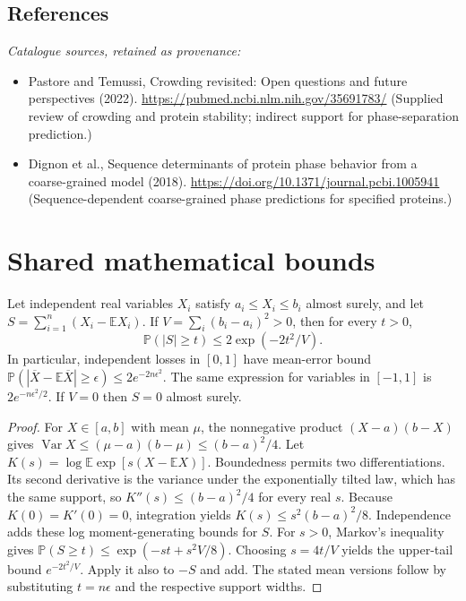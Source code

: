 \documentclass[11pt]{article}
\begin{document}
\subsection{References}
\noindent\emph{Catalogue sources, retained as provenance:}
\begin{itemize}
\item Pastore and Temussi, Crowding revisited: Open questions and future perspectives (2022). \url{https://pubmed.ncbi.nlm.nih.gov/35691783/} (Supplied review of crowding and protein stability; indirect support for phase-separation prediction.)
\item Dignon et al., Sequence determinants of protein phase behavior from a coarse-grained model (2018). \url{https://doi.org/10.1371/journal.pcbi.1005941} (Sequence-dependent coarse-grained phase predictions for specified proteins.)
\end{itemize}




\section{Shared mathematical bounds}\label{app:bounds}
\begin{lemma}\label{lem:bounded}
Let independent real variables $X_i$ satisfy $a_i\leq X_i\leq b_i$ almost surely,
and let $S=\sum_{i=1}^n(X_i-\mathbb{E} X_i)$. If
$V=\sum_i(b_i-a_i)^2>0$, then for every $t>0$,
\[
 \mathbb{P}(|S|\geq t)\leq 2\exp(-2t^2/V).
\]
In particular, independent losses in $[0,1]$ have mean-error bound
$\mathbb{P}(|\overline X-\mathbb{E}\overline X|\geq\epsilon)
\leq2e^{-2n\epsilon^2}$. The same expression for variables in $[-1,1]$
is $2e^{-n\epsilon^2/2}$. If $V=0$ then $S=0$ almost surely.
\end{lemma}
\begin{proof}
For $X\in[a,b]$ with mean $\mu$, the nonnegative product
$(X-a)(b-X)$ gives
$\operatorname{Var} X\leq(\mu-a)(b-\mu)\leq(b-a)^2/4$.
Let $K(s)=\log\mathbb{E}\exp[s(X-\mathbb{E} X)]$.
Boundedness permits two differentiations. Its second derivative is the variance
under the exponentially tilted law, which has the same support, so
$K''(s)\leq(b-a)^2/4$ for every real $s$.
Because $K(0)=K'(0)=0$, integration yields
$K(s)\leq s^2(b-a)^2/8$.
Independence adds these log moment-generating bounds for $S$.
For $s>0$, Markov's inequality gives
$\mathbb{P}(S\geq t)\leq\exp(-st+s^2V/8)$.
Choosing $s=4t/V$ yields the upper-tail bound $e^{-2t^2/V}$.
Apply it also to $-S$ and add. The stated mean versions follow by substituting
$t=n\epsilon$ and the respective support widths.
\end{proof}
\end{document}
